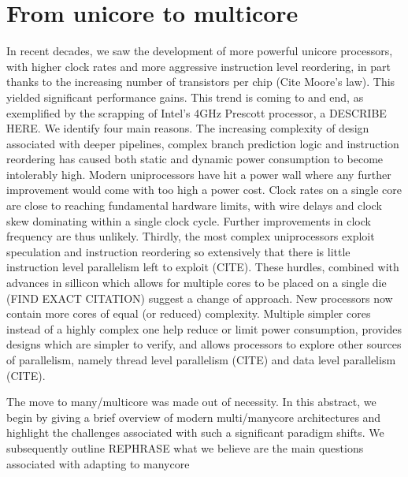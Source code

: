 \section{From unicore to multicore}

In recent decades, we saw the development of more powerful
unicore processors, with higher clock rates and more
aggressive instruction level reordering, in part
thanks to the increasing number of transistors per chip
(Cite Moore's law). This yielded
significant performance gains. This trend is coming to and end,
 as exemplified by the scrapping of Intel's
4GHz Prescott processor, a DESCRIBE HERE. We identify
four main reasons. The increasing complexity
of design associated with deeper pipelines,
complex branch prediction logic and instruction
reordering has caused both static and dynamic power consumption
to become intolerably high. Modern uniprocessors have hit
a power wall where any further improvement would come
with too high a power cost. Clock rates on
a single core are close to reaching fundamental hardware limits,
with wire delays and clock skew dominating within a single clock cycle.
Further improvements in clock frequency are thus unlikely. Thirdly, the most
complex uniprocessors exploit speculation and instruction reordering so
extensively that there is little instruction level parallelism left to
exploit (CITE). These hurdles, combined with advances in sillicon which allows
for multiple cores to be placed on a single die (FIND EXACT CITATION)
suggest a change of approach. New processors now contain
more cores of equal (or reduced) complexity. Multiple simpler cores
instead of a highly complex one help reduce or limit power consumption,
provides designs which are simpler to verify, and allows processors
to explore other sources of parallelism, namely thread level parallelism (CITE)
and data level parallelism (CITE).

The move to many/multicore was made out of necessity. In this abstract, we begin
by giving a brief overview of modern multi/manycore architectures and highlight
the challenges associated with such a significant paradigm shifts. We subsequently
outline REPHRASE what we believe are the main questions associated with 
adapting to manycore


